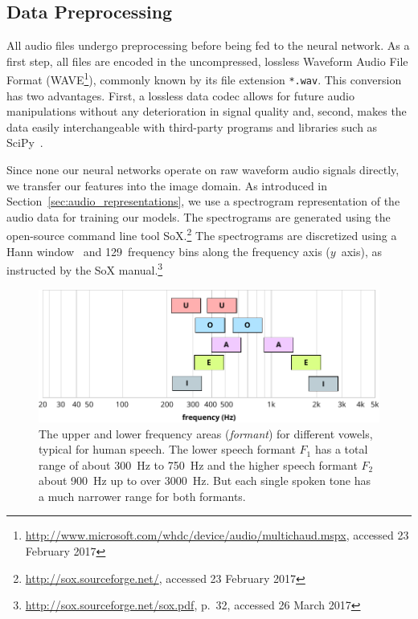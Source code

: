 \subsection{Data Preprocessing}
\label{sec:data_processing}

	All audio files undergo preprocessing before being fed to the neural network. As a first step, all files are encoded in the uncompressed, lossless Waveform Audio File Format (WAVE\footnote{\url{http://www.microsoft.com/whdc/device/audio/multichaud.mspx}, accessed 23 February 2017}), commonly known by its file extension \texttt{*.wav}. This conversion has two advantages. First, a lossless data codec allows for future audio manipulations without any deterioration in signal quality and, second, makes the data easily interchangeable with third-party programs and libraries such as SciPy~\cite{scipy}.

	Since none our neural networks operate on raw waveform audio signals directly, we transfer our features into the image domain. As introduced in Section~\ref{sec:audio_representations}, we use a spectrogram representation of the audio data for training our models. The spectrograms are generated using the open-source command line tool SoX.\footnote{\url{http://sox.sourceforge.net/}, accessed 23 February 2017} The spectrograms are discretized using a Hann window~\cite{blackman1958measurement} and \num{129}~frequency bins along the frequency axis ($y$~axis), as instructed by the SoX manual.\footnote{\url{http://sox.sourceforge.net/sox.pdf}, p.~32, accessed 26 March 2017}
%
	\begin{figure}[tp]
  		\centering
    	\includegraphics{img/frequencies.pdf}
    	\caption{The upper and lower frequency areas (\emph{formant}) for different vowels, typical for human speech. The lower speech formant $F_1$ has a total range of about \SI{300}{\hertz} to \SI{750}{\hertz} and the higher speech formant $F_2$ about \SI{900}{\hertz} up to over \SI{3000}{\hertz}. But each single spoken tone has a much narrower range for both formants.}
    	\label{img:frequencies}
	\end{figure}
%

